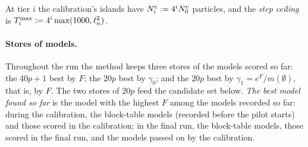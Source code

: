 At tier $i$ the calibration's islands have $N^{\mathrm c}_i:=4^iN^{\mathrm c}_0$ particles, and the \emph{step ceiling} is
$T^{\max}_i:=4^i\max(1000,\ell_n^2)$.

\paragraph{Stores of models.} Throughout the run the method keeps three stores of the models scored so far: the $40p+1$
best by $F$; the $20p$ best by $\gamma_0$; and the $20p$ best by $\gamma_1=e^{F}/m(\emptyset)$, that is, by $F$. The two
stores of $20p$ feed the candidate set below. \emph{The best model found so far} is the model with the highest $F$ among
the models recorded so far: during the calibration, the block-table models (recorded before the pilot starts) and those
scored in the calibration; in the final run, the block-table models, those scored in the final run, and the models passed
on by the calibration.

